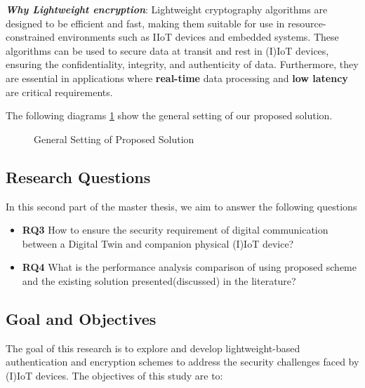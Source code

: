 \textbf{\textit{Why Lightweight encryption}}:
Lightweight cryptography algorithms are designed to be efficient and fast, making them suitable for use in resource-constrained environments such as IIoT devices and embedded systems.
These algorithms can be used to secure data at transit and rest in (I)IoT devices, ensuring the confidentiality, integrity, and authenticity of data. Furthermore, they are essential in applications where \textbf{real-time} data processing and \textbf{low latency} are critical requirements.

The following diagrams \ref{fig:ps-scheme} show the general setting of our proposed solution. 

\begin{figure}[H]
    \label{fig:ps-scheme}
    \caption{General Setting of Proposed Solution}
    \centering
    
    
\end{figure}


\subsection{Research Questions}
In this second part of the master thesis, we aim to answer the following questions 
\begin{itemize}
    \item \textbf{RQ3} How to ensure the security requirement of digital communication between a Digital Twin and companion physical (I)IoT device?
    \item \textbf{RQ4} What is the performance analysis comparison of using proposed scheme and the existing solution presented(discussed) in the literature?
\end{itemize}


\subsection{Goal and Objectives}
The goal of this research is to explore and develop lightweight-based authentication and encryption schemes to address the security challenges faced by (I)IoT devices. The objectives of this study are to:

